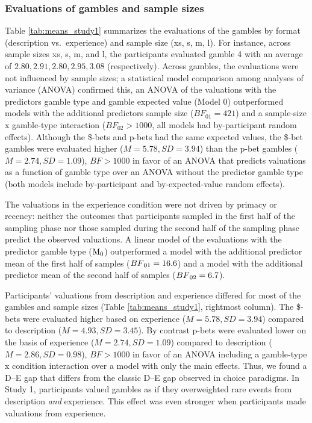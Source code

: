 \documentclass[a4paper, man, floatsintext]{apa6}
\title{}
\author{Jana B. Jarecki}
\date{15 Januar, 2020}
\begin{document}
\subsubsection{Evaluations of gambles and sample sizes}

Table \ref{tab:means_study1} summarizes the evaluations of the gambles
by format (description vs.~experience) and sample size (xs, s, m, l).
For instance, across sample sizes xs, s, m, and l, the participants
evaluated gamble 4 with an average of \(2.80, 2.91, 2.80, 2.95, 3.08\)
(respectively). Across gambles, the evaluations were not influenced by
sample sizes; a statistical model comparison among analyses of variance
(ANOVA) confirmed this, an ANOVA of the valuations with the predictors
gamble type and gamble expected value (Model 0) outperformed models with
the additional predictors sample size (\(BF_{01} = 421\)) and a
sample-size x gamble-type interaction (\(BF_{02} > 1000\), all models
had by-participant random effects). Although the \$-bets and p-bets had
the same expected values, the \$-bet gambles were evaluated higher
(\(M=5.78, SD=3.94\)) than the p-bet gambles (\(M=2.74, SD=1.09\)),
\(BF > 1000\) in favor of an ANOVA that predicts valuations as a
function of gamble type over an ANOVA without the predictor gamble type
(both models include by-participant and by-expected-value random
effects).

The valuations in the experience condition were not driven by primacy or
recency: neither the outcomes that participants sampled in the first
half of the sampling phase nor those sampled during the second half of
the sampling phase predict the observed valuations. A linear model of
the evaluations with the predictor gamble type
(\(\mathrm{M}\textsubscript{0}\)) outperformed a model with the
additional predictor mean of the first half of samples
(\(BF\textsubscript{01} = 16.6\)) and a model with the additional
predictor mean of the second half of samples
(\(BF\textsubscript{02} = 6.7\)).


Participants' valuations from description and experience differed for
most of the gambles and sample sizes (Table \ref{tab:means_study1},
rightmost column). The \$-bets were evaluated higher based on experience
(\(M=5.78, SD=3.94\)) compared to description (\(M=4.93, SD=3.45\)). By
contrast p-bets were evaluated lower on the basis of experience
(\(M=2.74, SD=1.09\)) compared to description (\(M=2.86, SD=0.98\)),
\(BF > 1000\) in favor of an ANOVA including a gamble-type x condition
interaction over a model with only the main effects. Thus, we found a
D--E gap that differs from the classic D--E gap observed in choice
paradigms. In Study 1, participants valued gambles as if they
overweighted rare events from description \textit{and} experience. This
effect was even stronger when participants made valuations from
experience.
\end{document}
